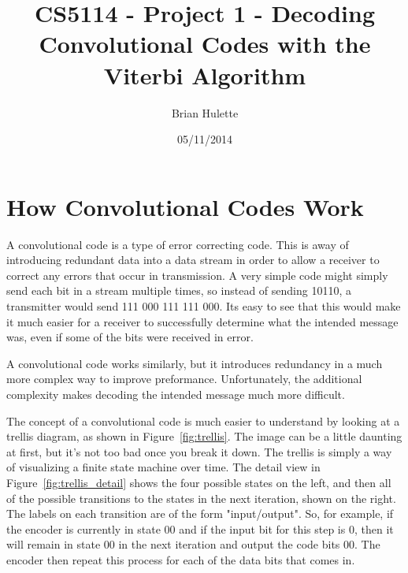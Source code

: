 \documentclass[11pt]{article}
\title{CS5114 - Project 1 - Decoding Convolutional Codes with the Viterbi Algorithm}
\author{Brian Hulette}
\date{05/11/2014}
\begin{document}
    \maketitle
    \thispagestyle{empty}
    \newpage
    \tableofcontents
    \thispagestyle{empty}
    \newpage
    \setcounter{page}{1}
    \section{How Convolutional Codes Work}
        A convolutional code is a type of error correcting code.
        This is away of introducing redundant data into a
        data stream in order to allow a receiver to correct any errors
        that occur in transmission.  A very simple code might simply send each
        bit in a stream multiple times, so instead of sending 10110, a
        transmitter would send 111 000 111 111 000.  Its easy to see that this
        would make it much easier for a receiver to successfully determine what
        the intended message was, even if some of the bits were received in
        error.

        A convolutional code works similarly, but it introduces redundancy in a
        much more complex way to improve preformance.  Unfortunately, the
        additional complexity makes decoding the intended message much more
        difficult.

        The concept of a convolutional code is much easier to understand by
        looking at a trellis diagram, as shown in Figure~\ref{fig:trellis}.  The image can
        be a little daunting at first, but it's not too bad once you break it
        down. The trellis is simply a way of visualizing a finite state
        machine over time. The detail view in Figure~\ref{fig:trellis_detail} shows the
        four possible states on the left, and then all of the possible
        transitions to the states in the next iteration, shown on the right.
        The labels on each transition are of the form "input/output".  So, for
        example, if the encoder is currently in state 00 and if the input bit
        for this step is 0, then it will remain in state 00 in the next
        iteration and output the code bits 00.  The encoder then repeat this process
        for each of the data bits that comes in.
\end{document}
